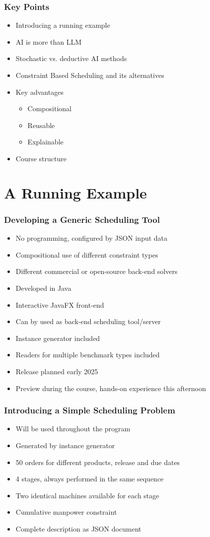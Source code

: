 \begin{frame}
\frametitle{Key Points}
\begin{itemize}
\item Introducing a running example
\item AI is more than LLM
\item Stochastic vs. deductive AI methods
\item Constraint Based Scheduling and its alternatives
\item Key advantages
\begin{itemize}
\item Compositional
\item Reusable
\item Explainable
\end{itemize}
\item Course structure
\end{itemize}
\end{frame}

\section{A Running Example}

\begin{frame}
\frametitle{Developing a Generic Scheduling Tool}
\begin{itemize}
\item No programming, configured by JSON input data
\item Compositional use of different constraint types
\item Different commercial or open-source back-end solvers
\item Developed in Java
\item Interactive JavaFX front-end
\item Can by used as back-end scheduling tool/server
\item Instance generator included
\item Readers for multiple benchmark types included
\item Release planned early 2025
\item Preview during the course, hands-on experience this afternoon
\end{itemize}
\end{frame}

\begin{frame}
\frametitle{Introducing a Simple Scheduling Problem}
\begin{itemize}
\item Will be used throughout the program
\item Generated by instance generator
\item 50 orders for different products, release and due dates
\item 4 stages, always performed in the same sequence
\item Two identical machines available for each stage
\item Cumulative manpower constraint
\item Complete description as JSON document
\end{itemize}
\end{frame}

